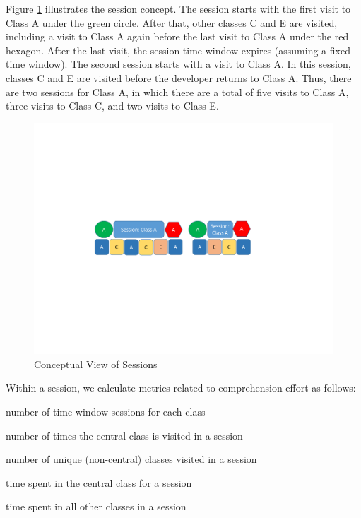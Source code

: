 Figure \ref{fig:SessionDataConcept} illustrates the session concept.  The session starts with the first visit to Class A under the green circle.  After that, other classes C and E are visited, including a visit to Class A again before the last visit to Class A under the red hexagon.  After the last visit, the session time window expires (assuming a fixed-time window).  The second session starts with a visit to Class A.  In this session, classes C and E are visited before the developer returns to Class A.  Thus, there are two sessions for Class A, in which there are a total of five visits to Class A, three visits to Class C, and two visits to Class E.

\begin{figure}
    \centering
    \includegraphics[width=\linewidth]{SessionDataConcept.pdf}
    \caption{Conceptual View of Sessions}
    \label{fig:SessionDataConcept}
\end{figure}


Within a session, we calculate metrics related to comprehension effort as follows:
\begin{description}[font=\itshape\mdseries,style=nextline]
    \item[\#~Sessions] number of time-window sessions for each class 
    \item[\#~Class~Visits] number of times the central class is visited in a session
    \item[\#~Other~Class~Accesses] number of unique (non-central) classes visited in a session
    \item[Time~Spent~in~Class] time spent in the central class for a session
    \item[Time~Spent~in~Other~Classes] time spent in all other classes in a session
\end{description}

